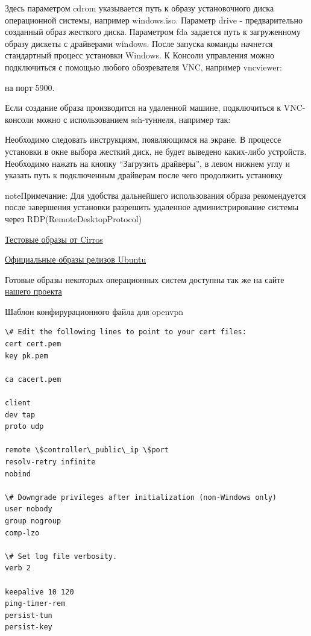 \documentclass[letterpaper,10pt,russian]{sphinxmanual}
\begin{document}
Здесь параметром cdrom указывается путь к образу установочного диска операционной системы, например windows.iso. Параметр drive - предварительно созданный образ жесткого диска. Параметром fda задается путь к загруженному образу дискеты с драйверами windows.
После запуска команды начнется стандартный процесс установки Windows. К Консоли управления можно подключиться с помощью любого обозревателя VNC, например vncviewer:


на порт 5900.


Если создание образа производится на удаленной машине, подключиться к VNC-консоли можно с использованием ssh-туннеля, например так:


Необходимо следовать инструкциям, появляющимся на экране. В процессе установки в окне выбора жесткий диск, не будет выведено каких-либо устройств. Необходимо нажать на кнопку ``Загрузить драйверы'', в левом нижнем углу и указать путь к подключенным драйверам после чего продолжить установку

\begin{notice}{note}{Примечание:}
Для удобства дальнейшего использования образа рекомендуется после завершения установки разрешить удаленное администрирование системы через RDP(RemoteDesktopProtocol)
\end{notice}

\href{https://launchpad.net/cirros/trunk/0.3.0/}{Тестовые образы от Cirros}

\href{http://uec-images.ubuntu.com/}{Официальные образы релизов Ubuntu}

Готовые образы некоторых операционных систем доступны так же на сайте \href{http://xenlet.stu.neva.ru}{нашего проекта}


Шаблон конфирурационного файла для openvpn

\begin{Verbatim}[commandchars=\\\{\}]
\# Edit the following lines to point to your cert files:
cert cert.pem
key pk.pem

ca cacert.pem

client
dev tap
proto udp

remote \$controller\_public\_ip \$port
resolv-retry infinite
nobind

\# Downgrade privileges after initialization (non-Windows only)
user nobody
group nogroup
comp-lzo

\# Set log file verbosity.
verb 2

keepalive 10 120
ping-timer-rem
persist-tun
persist-key
\end{Verbatim}
\end{document}
